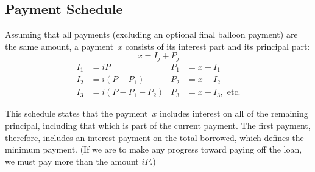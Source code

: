 

\subsection{Payment Schedule}
Assuming that all payments (excluding an optional final balloon payment)
are the same amount, a payment~$x$ consists of its interest part and
its principal part:
\begin{equation}
\label{amort:components}
x=I_j + P_j
\end{equation}
\begin{align*}
I_1 &= iP               & P_1 &= x - I_1 \\
I_2 &= i(P - P_1)       & P_2 &= x - I_2 \\
I_3 &= i(P - P_1 - P_2) & P_3 &= x - I_3,\mbox{ etc.}
\end{align*}

This schedule states that the payment~$x$ includes interest on all
of the remaining principal, including that which is part of the
current payment.  The first payment, therefore, includes
an interest payment on the total borrowed, which defines the minimum
payment.  (If we are to make any progress toward paying off the loan,
we must pay more than the amount $iP$.)

